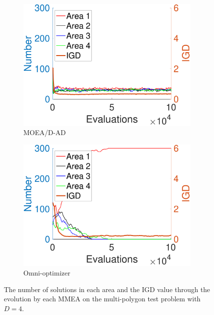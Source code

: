\documentclass[conference]{IEEEtran}
\begin{document}
\begin{figure}[t!]
    \begin{subfigure}[b]{.24\textwidth}
    \includegraphics[width=\linewidth]{Section5/dim4/Diversity/MOEADAD}
    \caption{MOEA/D-AD}
    \end{subfigure}
    \begin{subfigure}[b]{.24\textwidth}
    \includegraphics[width=\linewidth]{Section5/dim4/Diversity/OmniOptimizer}
    \caption{Omni-optimizer}
    \end{subfigure}
    \caption{The number of solutions in each area and the IGD value through the evolution by each MMEA on the multi-polygon test problem with $D=4$.}
    \label{fig: MMEAs Diversity dim=4}
\end{figure}
\end{document}
